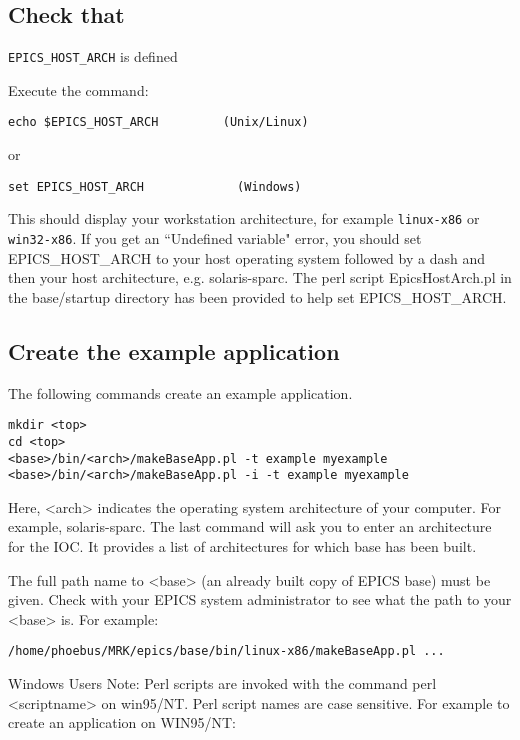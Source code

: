 \subsection{Check that }\verb|EPICS_HOST_ARCH| is defined

Execute the command:

\begin{verbatim}echo $EPICS_HOST_ARCH         (Unix/Linux)
\end{verbatim}or

\begin{verbatim}set EPICS_HOST_ARCH             (Windows)
\end{verbatim}This should display your workstation architecture, for example \verb|linux-x86| or \verb|win32-x86|. If you get an ``Undefined 
variable" error, you should set EPICS\_HOST\_ARCH to your host operating system followed by a dash and then your host 
architecture, e.g.  solaris-sparc. The perl script EpicsHostArch.pl in the base/startup directory has been provided to help 
set EPICS\_HOST\_ARCH.

\subsection{Create the example application}

The following commands create an example application.

\begin{verbatim}mkdir <top>
cd <top>
<base>/bin/<arch>/makeBaseApp.pl -t example myexample
<base>/bin/<arch>/makeBaseApp.pl -i -t example myexample
\end{verbatim}Here, \textless{}arch\textgreater{} indicates the operating system architecture of your computer.  For example, solaris-sparc. The last command 
will ask you to enter an architecture for the IOC. It provides a list of architectures for which base has been built.

The full path name to \textless{}base\textgreater{} (an already built copy of EPICS base) must be given. Check with your EPICS system 
administrator to see what the path to your \textless{}base\textgreater{} is. For example:

\begin{verbatim}/home/phoebus/MRK/epics/base/bin/linux-x86/makeBaseApp.pl ...
\end{verbatim}Windows Users Note: Perl scripts are invoked with the command perl \textless{}scriptname\textgreater{} on win95/NT. Perl script names are 
case sensitive. For example to create an application on WIN95/NT:

